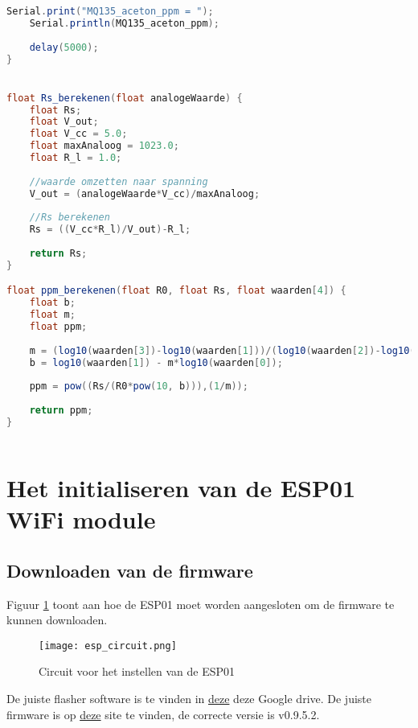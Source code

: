 \begin{lstlisting}[language=Java, caption={Berekenen van de ppm waarden voor de MQ-135}]
    Serial.print("MQ135_aceton_ppm = ");
    Serial.println(MQ135_aceton_ppm);
    
    delay(5000);
}


float Rs_berekenen(float analogeWaarde) {
    float Rs;
    float V_out;
    float V_cc = 5.0;
    float maxAnaloog = 1023.0;
    float R_l = 1.0;
    
    //waarde omzetten naar spanning
    V_out = (analogeWaarde*V_cc)/maxAnaloog;
    
    //Rs berekenen
    Rs = ((V_cc*R_l)/V_out)-R_l;
    
    return Rs;
}

float ppm_berekenen(float R0, float Rs, float waarden[4]) {
    float b;
    float m;
    float ppm;
    
    m = (log10(waarden[3])-log10(waarden[1]))/(log10(waarden[2])-log10(waarden[0]));
    b = log10(waarden[1]) - m*log10(waarden[0]);
    
    ppm = pow((Rs/(R0*pow(10, b))),(1/m));
    
    return ppm;
}
    
\end{lstlisting}



\section{Het initialiseren van de ESP01 WiFi module}
\label{sec:esp_init}

\subsection{Downloaden van de firmware}
\label{subsec:firmware}

Figuur \ref{fig:esp_circuit} toont aan hoe de ESP01 moet worden aangesloten om de firmware te kunnen downloaden.

\begin{figure}[h]
    \texttt{[image: esp\_circuit.png]}
    \caption[Circuit ESP01]{Circuit voor het instellen van de ESP01}
    \label{fig:esp_circuit}
\end{figure}

De juiste flasher software is te vinden in \href{https://drive.google.com/open?id=1tD7IpE4rPMOWyQHP6xzjdRKjJAyeEZPj}{deze} deze Google drive. De juiste firmware is op \href{https://wiki.aprbrother.com/en/Firmware_For_ESP8266.html}{deze} site te vinden, de correcte versie is v0.9.5.2.

